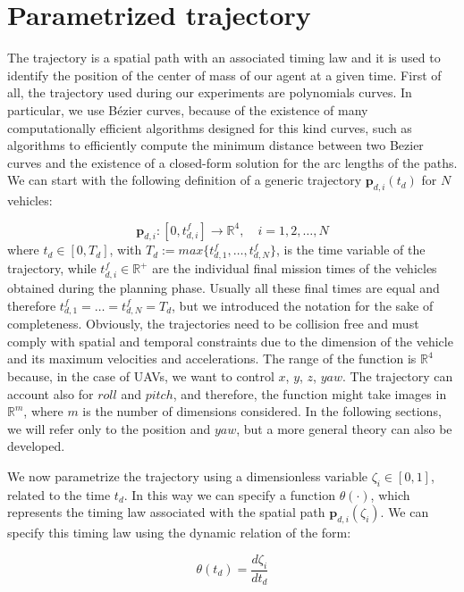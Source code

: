 \section{Parametrized trajectory\label{sec:parametrized_trajectory}}
The trajectory is a spatial path with an associated timing law and it is used
to identify the position of the center of mass of our agent at a given time.
First of all, the trajectory used during our experiments are polynomials curves.
In particular, we use Bézier curves, because of the existence of many
computationally efficient algorithms designed for this kind curves,
such as algorithms to efficiently compute the minimum distance between two Bezier curves
and the existence of a closed-form solution for the arc lengths of the paths.
We can start with the following definition of a generic trajectory $ \bm{p}_{d,i}(t_d) $
for $ N $ vehicles:

\begin{equation}  \label{eq:traj_def}
  \bm{p}_{d,i}:[0,t^f_{d,i}] \rightarrow \mathbb{R}^4, \quad i = 1,2,\dots,N
\end{equation}
where $ t_d \in [0, T_d] $, with $T_d := max \{ t^f_{d,1}, \dots , t^f_{d,N} \} $,
is the time variable of the trajectory, while $ t^f_{d,i} \in \mathbb{R}^+ $
are the individual final mission times of the vehicles obtained during the planning
phase. Usually all these final times are equal and therefore
$ t^f_{d,1} = \dots = t^f_{d,N} = T_d$, but we introduced the notation
for the sake of completeness.
Obviously, the trajectories need to be collision free and must comply with spatial
and temporal constraints due to the dimension of the vehicle and its maximum
velocities and accelerations.
The range of the function is $\mathbb{R}^4$ because, in the case of UAVs, we want
to control $x$, $y$, $z$, $yaw$.
The trajectory can account also for $roll$ and $pitch$, and therefore, the function might take
images in $\mathbb{R}^m$, where $m$ is the number of dimensions considered.
In the following sections, we will refer only to the position and $yaw$, but a more general
theory can also be developed.

We now parametrize the trajectory using a dimensionless variable $ \zeta_i \in [0,1]$,
related to the time $t_d$. In this way we can specify a function $ \theta( \cdot )$,
which represents the timing law associated with the spatial path $\bm{p}_{d,i}(\zeta_i)$.
We can specify this timing law using the dynamic relation of the form:

\begin{equation}  \label{eq:tim_law_def}
  \theta( t_d ) = \frac{d \zeta_i}{dt_d}
\end{equation}

